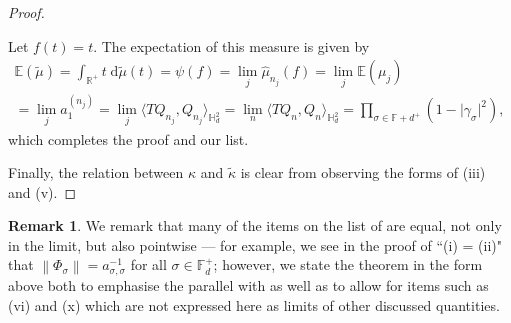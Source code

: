 \documentclass[11pt,reqno]{amsart}
\newcommand\norm[1]{\left\lVert#1\right\rVert}
\def\g{\gamma}
\def\k{\kappa}
\def\s{\sigma}
\def\P{\Phi}
\def\rmd{\mathrm{d}}
\def\RR{\mathbb{R}}
\def\EE{\mathbb{E}}
\def\FF{\mathbb{F}}
\def\HH{\mathbb{H}}
\theoremstyle{definition}
\newtheorem{remark}[theorem]{Remark}
\numberwithin{equation}{section}
\renewcommand{\tilde}{\widetilde}
\renewcommand{\hat}{\widehat}
\begin{document}
\begin{proof}
\begin{enumerate}[align=left]
        Let \(f(t) = t\). The expectation of this measure is given by
        \begin{multline*}
            \EE(\tilde{\mu}) = \int_{\RR^+} t \; \rmd \tilde{\mu}(t) = \psi(f) = \lim_j \hat{\mu}_{n_j}(f) = \lim_j \EE(\mu_j) \\ = \lim_j a_1^{(n_j)} = \lim_j \langle TQ_{n_j}, Q_{n_j} \rangle_{\HH_d^2} = \lim_n \langle TQ_{n}, Q_{n} \rangle_{\HH_d^2} = \prod_{\s\in\FF+d^+}(1 - \lvert \g_\s \rvert^2),
        \end{multline*}
        which completes the proof and our list.
    \end{enumerate}

    Finally, the relation between \(\k\) and \(\tilde{\k}\) is clear from observing the forms of (iii) and (v).

\end{proof}

\begin{remark}
    We remark that many of the items on the list of  are equal, not only in the limit, but also pointwise --- for example, we see in the proof of ``(i) = (ii)" that \(\norm{\P_\s} = a_{\s,\s}^{-1}\) for all \(\s \in \FF_d^+\); however, we state the theorem in the form above both to emphasise the parallel with  as well as to allow for items such as (vi) and (x) which are not expressed here as limits of other discussed quantities.
\end{remark}
\end{document}
